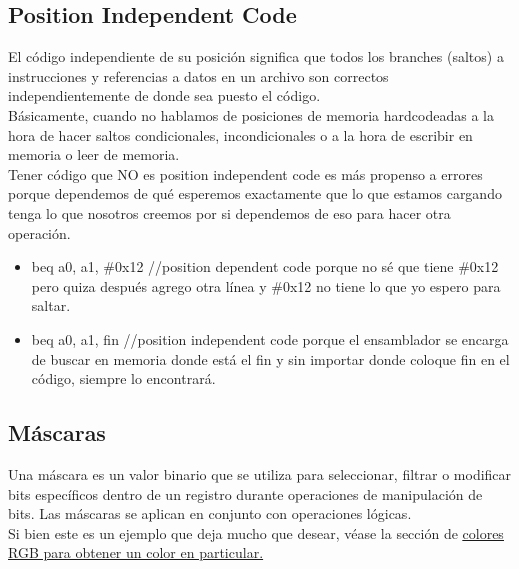 \documentclass[10pt,a4paper]{article}
\begin{document}
\subsection*{Position Independent Code}
El código independiente de su posición significa que todos los branches (saltos) a instrucciones y referencias a datos en un archivo son correctos independientemente de donde sea puesto el código. \\
Básicamente, cuando no hablamos de posiciones de memoria hardcodeadas a la hora de hacer saltos condicionales, incondicionales o a la hora de escribir en memoria o leer de memoria. \\
Tener código que NO es position independent code es más propenso a errores porque dependemos de qué esperemos exactamente que lo que estamos cargando tenga lo que nosotros creemos por si dependemos de eso para hacer otra operación. \\
\begin{itemize}
    \item beq a0, a1, \#0x12 //position dependent code porque no sé que tiene \#0x12 pero quiza después agrego otra línea y \#0x12 no tiene lo que yo espero para saltar.
    \item beq a0, a1, fin //position independent code porque el ensamblador se encarga de buscar en memoria donde está el fin y sin importar donde coloque fin en el código, siempre lo encontrará.
\end{itemize}
\subsection*{Máscaras}
Una máscara es un valor binario que se utiliza para seleccionar, filtrar o modificar bits específicos dentro de un registro durante operaciones de manipulación de bits. Las máscaras se aplican en conjunto con operaciones lógicas. \\

Si bien este es un ejemplo que deja mucho que desear, véase la sección de \hyperref[subsec:byte_particular_desplazamiento]{\underline{colores RGB para obtener un color en particular.}}
\end{document}
